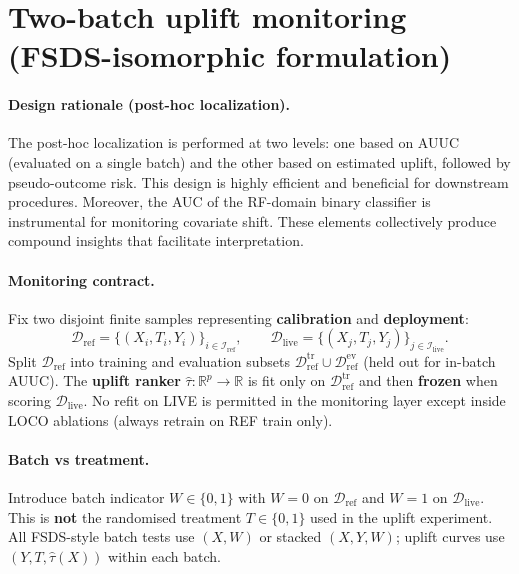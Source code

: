 
\section{Two-batch uplift monitoring (FSDS-isomorphic formulation)}

\paragraph{Design rationale (post-hoc localization).}
The post-hoc localization is performed at two levels: one based on AUUC (evaluated on a single batch) and the other based on estimated uplift, followed by pseudo-outcome risk.
This design is highly efficient and beneficial for downstream procedures.
Moreover, the AUC of the RF-domain binary classifier is instrumental for monitoring covariate shift.
These elements collectively produce compound insights that facilitate interpretation.

\paragraph{Monitoring contract.}
Fix two disjoint finite samples representing \textbf{calibration} and \textbf{deployment}:
\[
  \mathcal{D}_{\mathrm{ref}} = \{(X_i,T_i,Y_i)\}_{i\in\mathcal{I}_{\mathrm{ref}}},
  \qquad
  \mathcal{D}_{\mathrm{live}} = \{(X_j,T_j,Y_j)\}_{j\in\mathcal{I}_{\mathrm{live}}}.
\]
Split $\mathcal{D}_{\mathrm{ref}}$ into training and evaluation subsets
$\mathcal{D}_{\mathrm{ref}}^{\mathrm{tr}}\cup\mathcal{D}_{\mathrm{ref}}^{\mathrm{ev}}$ (held out for in-batch AUUC).
The \textbf{uplift ranker} $\hat\tau:\mathbb{R}^p\to\mathbb{R}$ is fit only on $\mathcal{D}_{\mathrm{ref}}^{\mathrm{tr}}$ and then \textbf{frozen} when scoring $\mathcal{D}_{\mathrm{live}}$.
No refit on LIVE is permitted in the monitoring layer except inside LOCO ablations (always retrain on REF train only).

\paragraph{Batch vs treatment.}
Introduce batch indicator $W\in\{0,1\}$ with $W=0$ on $\mathcal{D}_{\mathrm{ref}}$ and $W=1$ on $\mathcal{D}_{\mathrm{live}}$.
This is \textbf{not} the randomised treatment $T\in\{0,1\}$ used in the uplift experiment.
All FSDS-style batch tests use $(X,W)$ or stacked $(X,Y,W)$; uplift curves use $(Y,T,\hat\tau(X))$ within each batch.

